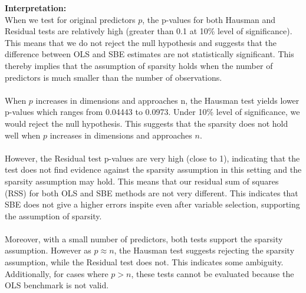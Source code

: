 \textbf{Interpretation:}\\
When we test for original predictors $p$, the p-values for both Hausman and Residual tests are relatively high (greater than 0.1 at 10\% level of significance). This means that we do not reject the null hypothesis and suggests that the difference between OLS and SBE estimates are not statistically significant. This thereby implies that the assumption of sparsity holds when the number of predictors is much smaller than the number of observations. \\
\\
When $p$ increases in dimensions and approaches n, the Hausman test yields lower p-values which ranges from 0.04443 to 0.0973. Under 10\% level of significance, we would reject the null hypothesis. This suggests that the sparsity does not hold well when $p$ increases in dimensions and approaches $n$.\\
\\
However, the Residual test p-values are very high (close to 1), indicating that the test does not find evidence against the sparsity assumption in this setting and the sparsity assumption may hold. This means that our residual sum of squares (RSS) for both OLS and SBE methods are not very different. This indicates that SBE does not give a higher errors inspite even after variable selection, supporting the assumption of sparsity.\\
\\
Moreover, with a small number of predictors, both tests support the sparsity assumption. However as $p \approx n$, the Hausman test suggests rejecting the sparsity assumption, while the Residual test does not. This indicates some ambiguity. Additionally, for cases where $p>n$, these tests cannot be evaluated because the OLS benchmark is not valid. 
